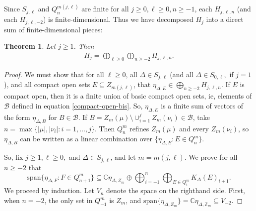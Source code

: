 \documentclass[12pt]{amsart}
\newcommand{\sm}{\setminus}
\newcommand{\sse}{\subseteq}
\newcommand{\spn}{\text{span}}
\newcommand{\mc}[1]{\mathcal{#1}}
\newcommand{\C}{\mathbb{C}}
\newcommand{\Z}{\mathbb{Z}}
\newcommand{\De}{\Delta}
\theoremstyle{plain} %
\newtheorem{Theorem}{Theorem}[section]
\theoremstyle{definition} %
\begin{document}
Since $S_{j,\ell}$ and $Q_{n}^{m(j,\ell)}$ are finite for all $j \ge 0, \ell \ge 0, n \ge -1$, each $H_{j,\ell,n}$ (and each $H_{j,\ell,-2}$) is finite-dimensional. Thus we have decomposed $H_j$ into a direct sum of finite-dimensional pieces:

\begin{Theorem}\label{thm H_j decomposition} Let $j \ge 1$. 
Then 
    \begin{align*}
        H_j = \bigoplus_{\ell \ge 0} \bigoplus_{n \ge -2} H_{j,\ell,n}.
    \end{align*}
\end{Theorem}

\begin{proof}
    We must show that for all $\ell \ge 0$, all $\De \in S_{j,\ell}$ (and all $\De \in S_{0,\ell},$ if $j = 1$), and all compact open sets $E \sse Z_{m(j,\ell)}$, that $\eta_{\De, E} \in \bigoplus_{n \ge -2} H_{j,\ell,n}$. If $E$ is compact open, then it is a finite union of basic compact open sets, ie, elements of $\mc{B}$ defined in equation \eqref{compact-open-bis}. So, $\eta_{\De,E}$ is a finite sum of vectors of the form $\eta_{\De,B}$ for $B \in \mc{B}$. If $B = Z_m(\mu) \sm \cup_{i=1}^j Z_m(\nu_i) \in \mc{B}$, take $n = \max\{ |\mu|, |\nu_i| : i = 1, \dots, j\}$. Then $Q^m_n$ refines $Z_m(\mu)$ and every $Z_m(\nu_i)$, so $\eta_{\De, B}$ can be written as a linear combination over $\{\eta_{\De, E} : E \in Q^m_n\}$.

    So, fix $j\ge 1, \ell \ge 0,$ and $\De \in S_{j,\ell}$, and let $m = m(j,\ell)$. We prove for all $n \ge -2$ that
    \begin{equation*}
        \spn\{\eta_{\De,F}: F \in Q^m_{n+1} \} \sse \C \eta_{\De, Z_m} \oplus \bigoplus_{i=-1}^n \bigoplus_{E \in Q_i^m} K_{\De}(E)_{i+1}.
    \end{equation*}
    We proceed by induction. Let $V_n$ denote the space on the righthand side.
    First, when $n = -2$, the only set in $Q^m_{-1}$ is $Z_m$, and $\spn\{\eta_{\De, Z_m}\} = \C \eta_{\De, \Z_m} \sse V_{-2}$.


\end{proof}
\end{document}
